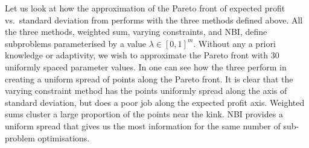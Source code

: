 \documentclass[main.tex]{subfiles}
\begin{document}
\begin{example}
  Let us look at how the approximation of the Pareto front of
  expected profit vs.~standard deviation from 
  performs with the three methods defined above.
  All the three methods, weighted sum, varying constraints, and NBI, define
  subproblems parameterised by a value $\lambda\in{[0,1]}^{m}$. Without any
  a priori knowledge or adaptivity, we wish to approximate the Pareto front
  with 30 uniformly spaced parameter values.
  In  one can see how the three
  perform in creating a uniform spread of points along the
  Pareto front. It is clear that the varying constraint method has the
  points uniformly spread along the axis of standard deviation, but
  does a poor job along the expected profit axis.
  Weighted sums cluster a large proportion of the points near the
  kink. NBI provides a uniform spread that gives us the most
  information for the same number of sub-problem optimisations.


\end{example}
\end{document}
